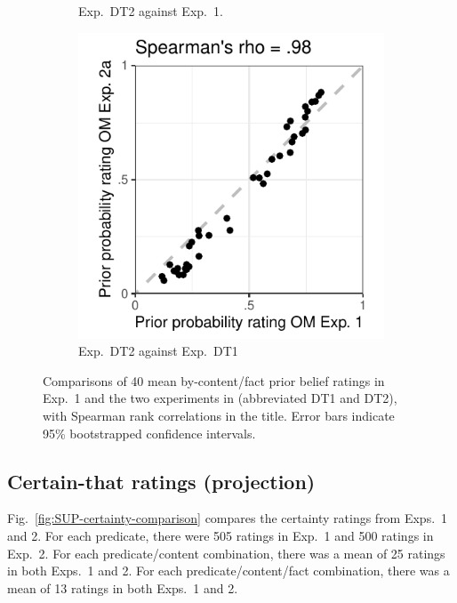 \documentclass[11pt,fleqn]{article}
\newcommand{\6}{\mbox{$[\hspace*{-.6mm}[$}}
\newcommand{\9}{\mbox{$]\hspace*{-.6mm}]$}}
\begin{document}
\begin{figure}[h!]
\begin{subfigure}[t]{.3\textwidth}
\caption{Exp.~DT2 against Exp.~1.}\label{fig:prior-exp1-expDT2a}
 \end{subfigure} \hfill \begin{subfigure}[t]{.3\textwidth}
\centering
\includegraphics[width=\textwidth]{../../results/exp1/graphs/SUP-priorOMExp1-by-priorOMExp2a}
\caption{Exp.~DT2 against Exp.~DT1}\label{fig:prior-expDT1-expDT2a}
 \end{subfigure}
\caption{Comparisons of 40 mean by-content/fact prior belief ratings in Exp.~1 and the two experiments in \citealt{degen-tonhauser-openmind} (abbreviated DT1 and DT2), with Spearman rank correlations in the title. Error bars indicate 95\% bootstrapped confidence intervals.}\label{fig:SUP-prior-comparison}
\end{figure}

\subsection{Certain-that ratings (projection)}

Fig.~\ref{fig:SUP-certainty-comparison} compares the certainty ratings from Exps.~1 and 2. For each predicate, there were 505 ratings in Exp.~1 and 500 ratings in Exp.~2. For each predicate/content combination, there was a mean of 25 ratings in both Exps.~1 and 2. For each predicate/content/fact combination, there was a mean of 13 ratings in both Exps.~1 and 2.
\end{document}
